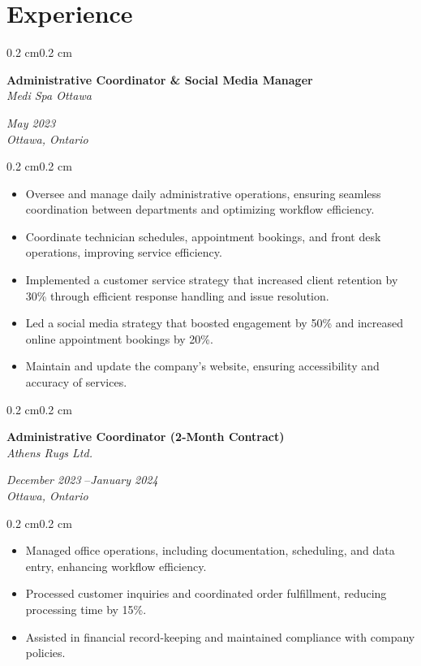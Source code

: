\documentclass[10pt, letterpaper]{article}
\newenvironment{highlights}{%
    \begin{itemize}[
        topsep=0.10 cm,%
        parsep=0.10 cm,%
        partopsep=0pt,%
        itemsep=0pt,%
        leftmargin=0.4 cm + 10pt%
    ]
}{%
    \end{itemize}%
}
\newenvironment{onecolentry}{%
    \begin{adjustwidth}{0.2 cm}{0.2 cm}%
}{%
    \end{adjustwidth}%
}
\newenvironment{twocolentry}[1]{%
    \begin{onecolentry}%
    \def\twocolentryarg{#1}%
    \noindent
    \begin{minipage}[t]{0.68\textwidth} %
}{%
    \end{minipage}\hfill%
    \begin{minipage}[t]{0.30\textwidth} %
      \raggedleft\twocolentryarg
    \end{minipage}%
    \vspace{0.2cm}%
    \end{onecolentry}%
}
\begin{document}
\section{Experience}
\begin{twocolentry}{%
\textit{May 2023 }\textit{} \\[0.1cm]
\textit{Ottawa, Ontario}%
}
    \textbf{Administrative Coordinator \& Social Media Manager }\\
    \textit{Medi Spa Ottawa }
\end{twocolentry}
\vspace{0.10 cm}
\begin{onecolentry}
    \begin{highlights}
        \item Oversee and manage daily administrative operations, ensuring seamless coordination between departments and optimizing workflow efficiency.
        \item Coordinate technician schedules, appointment bookings, and front desk operations, improving service efficiency.
        \item Implemented a customer service strategy that increased client retention by 30\% through efficient response handling and issue resolution.
        \item Led a social media strategy that boosted engagement by 50\% and increased online appointment bookings by 20\%.
        \item Maintain and update the company’s website, ensuring accessibility and accuracy of services.
    \end{highlights}
\end{onecolentry}
\vspace{0.2 cm}
\begin{twocolentry}{%
\textit{December 2023 }--\textit{January 2024} \\[0.1cm]
\textit{Ottawa, Ontario}%
}
    \textbf{Administrative Coordinator (2-Month Contract) }\\
    \textit{Athens Rugs Ltd. }
\end{twocolentry}
\vspace{0.10 cm}
\begin{onecolentry}
    \begin{highlights}
        \item Managed office operations, including documentation, scheduling, and data entry, enhancing workflow efficiency.
        \item Processed customer inquiries and coordinated order fulfillment, reducing processing time by 15\%.
        \item Assisted in financial record-keeping and maintained compliance with company policies.
    \end{highlights}
\end{onecolentry}
\end{document}
